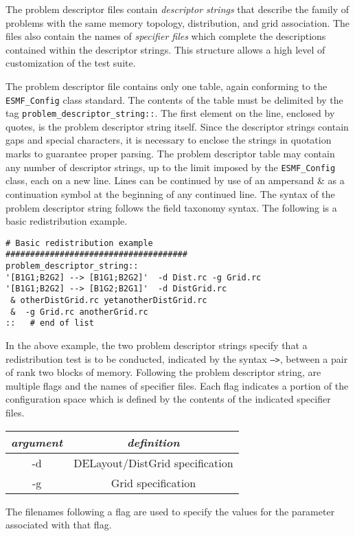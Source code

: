 The problem descriptor files contain \textit{descriptor strings} that describe the family 
of problems with the same memory topology, distribution, and grid association. 
The files also contain the names of \textit{specifier files} which complete the descriptions 
contained within the descriptor strings. This structure allows a high level of customization of the test suite.

The problem descriptor file contains only one table, again conforming to the \texttt{ESMF\_Config} class standard. 
The contents of the table must be delimited by the tag \texttt{problem\_descriptor\_string::}. 
The first element on the line, enclosed by quotes, is the problem descriptor string itself. 
Since the descriptor strings contain gaps and special characters, it is necessary 
to enclose the strings in quotation marks to guarantee proper parsing. 
The problem descriptor table may contain any number of descriptor strings, 
up to the limit imposed by the \texttt{ESMF\_Config} class, each on a new line. 
Lines can be continued by use of an ampersand {\&} as a continuation symbol 
at the beginning of any continued line. 
The syntax of the problem descriptor string follows the field taxonomy syntax. 
The following is a basic redistribution example.
\begin{verbatim}
# Basic redistribution example
#####################################
problem_descriptor_string::
'[B1G1;B2G2] --> [B1G1;B2G2]'  -d Dist.rc -g Grid.rc 
'[B1G1;B2G2] --> [B1G2;B2G1]'  -d DistGrid.rc 
 & otherDistGrid.rc yetanotherDistGrid.rc
 &  -g Grid.rc anotherGrid.rc  
::   # end of list
\end{verbatim}
In the above example, the two problem descriptor strings specify that a redistribution test 
is to be conducted, indicated by the syntax  \texttt{-->}, between a pair of rank two blocks of memory. 
Following the problem descriptor string, are multiple flags and the names of specifier files. 
Each flag indicates a portion of the configuration space which is defined by the contents 
of the indicated specifier files.  
\begin{center}
\begin{tabular}{| c | c |} \hline
{\em argument } & {\em definition} \\
\hline \hline
-d & DELayout/DistGrid specification \\
-g & Grid specification \\
\hline 
\end{tabular}
\end{center}
The filenames following a flag are used to specify the values for the parameter associated with that flag. 
